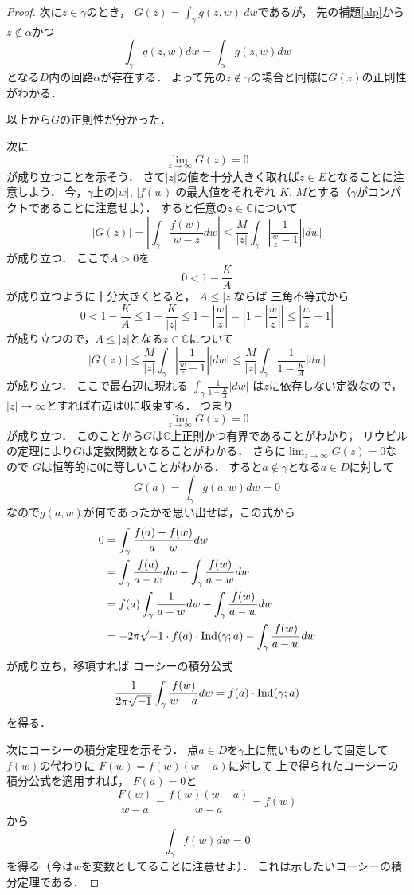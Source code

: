 \documentclass[leqno, 12pt, a4paper]{jsarticle}
\newcommand{\cc}{\mathbb{C}}
\newcommand{\dpst}{\displaystyle}
\newcommand{\ind}{\text{{\rm Ind}}}
\newcommand{\img}{\sqrt{-1}}
\begin{document}
\begin{proof}
次に$z\in \gamma$のとき，
$\dpst G(z)=\int_{\gamma}g(z,w)\ dw$であるが，
先の補題\ref{alp}から$z\not\in \alpha$かつ
\[
\int_{\gamma}g(z,w) dw=\int_{\alpha}g(z,w) dw
\]
となる$D$内の回路$\alpha$が存在する．
よって先の$z\not\in \gamma$の場合と同様に$G(z)$の正則性がわかる．
\par
以上から$G$の正則性が分かった．
\par
次に
\[
\lim_{z \to \infty}G(z)=0
\]
が成り立つことを示そう．
さて$|z|$の値を十分大きく取れば$z\in E$となることに注意しよう．
今，$\gamma$上の$|w|$, $|f(w)|$の最大値をそれぞれ 
$K$, 
$M$とする（$\gamma$がコンパクトであることに注意せよ）．
すると任意の$z\in \cc$について
\[
|G(z)|=\left|\int_{\gamma}\frac{f(w)}{w-z}dw \right|\le 
\frac{M}{|z|}\int_{\gamma}\left|\frac{1}{\frac{w}{z}-1}\right||dw|
\]
が成り立つ．
ここで$A>0$を
\[
0<1-\frac{K}{A}
\]
が成り立つように十分大きくとると，
$A\le |z|$ならば
三角不等式から
\[
0<1-\frac{K}{A}\le1-\frac{K}{|z|}\le 1-\left|\frac{w}{z}\right|= \left|1-\left|\frac{w}{z}\right|\right|\le \left|\frac{w}{z}-1\right|
\]
が成り立つので，$A\le |z|$となる$z\in \cc$について
\[
|G(z)|\le \frac{M}{|z|}\int_{\gamma}\left|\frac{1}{\frac{w}{z}-1}\right||dw|\le 
\frac{M}{|z|}\int_{\gamma}\frac{1}{1-\frac{K}{A}}|dw|
\]
が成り立つ．
ここで最右辺に現れる
$\dpst\int_{\gamma}\frac{1}{1-\frac{K}{A}}|dw|$
は$z$に依存しない定数なので，
$|z|\rightarrow \infty$とすれば右辺は$0$に収束する．
つまり
\[
\lim_{z \to \infty}G(z)=0
\]
が成り立つ．
このことから$G$は$\cc$上正則かつ有界であることがわかり，
リウビルの定理により$G$は定数関数となることがわかる．
さらに$\dpst\lim_{z \to \infty}G(z)=0$なので
$G$は恒等的に$0$に等しいことがわかる．
すると$a\not\in \gamma$となる$a\in D$に対して
\[
G(a)=\int_{\gamma}g(a,w) dw=0
\]
なので$g(a,w)$が何であったかを思い出せば，この式から
\begin{align*}
0&=\int_{\gamma}\frac{f(a)-f(w)}{a-w}dw\\
&=
\int_{\gamma}\frac{f(a)}{a-w}dw-\int_{\gamma}\frac{f(w)}{a-w}dw\\
&=f(a)\int_{\gamma}\frac{1}{a-w}dw-\int_{\gamma}\frac{f(w)}{a-w}dw\\
&=-2\pi \img\cdot f(a)\cdot \ind(\gamma;a)-\int_{\gamma}\frac{f(w)}{a-w}dw
\end{align*}
が成り立ち，移項すれば
コーシーの積分公式
\[
\frac{1}{2\pi \img}\int_{\gamma}\frac{f(w)}{w-a}dw
=f(a)\cdot \ind(\gamma;a)
\]
を得る．
\par
次にコーシーの積分定理を示そう．
点$a\in D$を$\gamma$上に無いものとして固定して$f(w)$の代わりに
$F(w)=f(w)(w-a)$に対して
上で得られたコーシーの積分公式を適用すれば，
$F(a)=0$と
\[
\frac{F(w)}{w-a}=\frac{f(w)(w-a)}{w-a}=f(w)
\]
から
\[
\int_{\gamma}f(w)dw=0
\]
を得る（今は$w$を変数としてることに注意せよ）．
これは示したいコーシーの積分定理である．
\end{proof}
\end{document}
